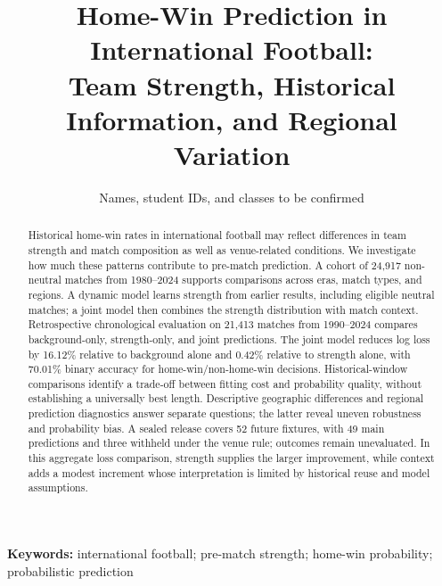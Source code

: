 \documentclass[a4paper,11pt]{article}
\title{Home-Win Prediction in International Football:\\
Team Strength, Historical Information, and Regional Variation}
\author{Names, student IDs, and classes to be confirmed}
\date{}
\begin{document}
\maketitle
\begin{abstract}
Historical home-win rates in international football may reflect differences in team strength and match composition as well as venue-related conditions. We investigate how much these patterns contribute to pre-match prediction. A cohort of 24,917 non-neutral matches from 1980--2024 supports comparisons across eras, match types, and regions. A dynamic model learns strength from earlier results, including eligible neutral matches; a joint model then combines the strength distribution with match context. Retrospective chronological evaluation on 21,413 matches from 1990--2024 compares background-only, strength-only, and joint predictions. The joint model reduces log loss by 16.12\% relative to background alone and 0.42\% relative to strength alone, with 70.01\% binary accuracy for home-win/non-home-win decisions. Historical-window comparisons identify a trade-off between fitting cost and probability quality, without establishing a universally best length. Descriptive geographic differences and regional prediction diagnostics answer separate questions; the latter reveal uneven robustness and probability bias. A sealed release covers 52 future fixtures, with 49 main predictions and three withheld under the venue rule; outcomes remain unevaluated. In this aggregate loss comparison, strength supplies the larger improvement, while context adds a modest increment whose interpretation is limited by historical reuse and model assumptions.
\end{abstract}
\noindent\textbf{Keywords:} international football; pre-match strength; home-win probability; probabilistic prediction
\clearpage




\begingroup
\fontsize{10}{11}\selectfont
\setlength{\emergencystretch}{2em}
\setlength{\bibsep}{1pt}


\endgroup
\end{document}

